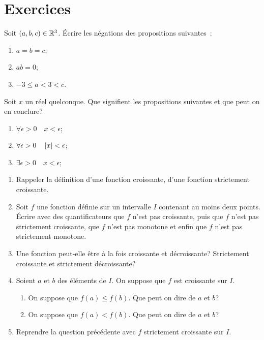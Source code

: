 \section{Exercices}
\begin{exercice}
    Soit \((a, b, c) \in \mathbb{R}^3\). Écrire les négations des propositions 
    suivantes~:
    \begin{enumerate}
        \item \(a=b=c\);
        \item \(ab=0\);
        \item \(-3 \leqslant a < 3 < c\).
    \end{enumerate}
\end{exercice}
\begin{exercice}
    Soit \(x\) un réel quelconque. Que signifient les propositions suivantes et 
    que peut on en conclure?
    \begin{enumerate}
        \item \(\forall \epsilon>0 \quad x<\epsilon\);
        \item \(\forall \epsilon>0 \quad \left\lvert x\right\rvert<\epsilon\);
        \item \(\exists \epsilon>0 \quad x<\epsilon\);
    \end{enumerate}
\end{exercice}
\begin{exercice}
    \begin{enumerate}
        \item Rappeler la définition d'une fonction croissante, d'une fonction
            strictement croissante.
        \item Soit \(f\) une fonction définie sur un intervalle \(I\) contenant 
            au moins deux points. Écrire avec des quantificateurs que \(f\) 
            n'est pas croissante, puis que \(f\) n'est pas strictement 
            croissante, que \(f\) n'est pas monotone et enfin que \(f\) n'est 
            pas strictement monotone.
        \item Une fonction peut-elle être à la fois croissante et décroissante?
            Strictement croissante et strictement décroissante?
        \item Soient \(a\) et \(b\) des éléments de \(I\). On suppose que \(f\) est
            croissante sur \(I\).
        \begin{enumerate}
            \item On suppose que \(f(a) \leqslant f(b)\). Que peut on dire de 
                \(a\) et \(b\)?
            \item On suppose que \(f(a) < f(b)\). Que peut on dire de \(a\) et 
                \(b\)?
        \end{enumerate}
        \item Reprendre la question précédente avec \(f\) strictement croissante 
            sur \(I\).
    \end{enumerate}
\end{exercice}
